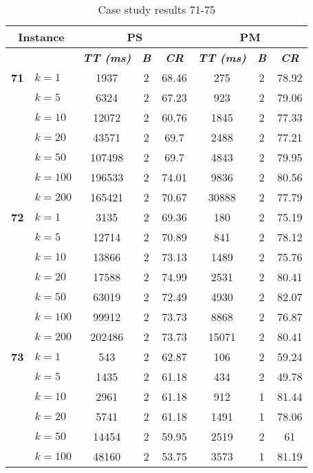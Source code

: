     \begin{table}[htbp]
    \caption{Case study results 71-75}
    \centering
    \begin{tabular}{|l|l|c|c|c|c|c|c|}
    \hline
    \multicolumn{ 2}{|c|}{\textbf{Instance}} & \multicolumn{ 3}{c|}{\textbf{PS}} & \multicolumn{ 3}{c|}{\textbf{PM}} \\ \hline
    \multicolumn{ 2}{|l|}{} & \textbf{\textit{TT (ms)}} & \textbf{\textit{B}} & \textbf{\textit{CR}} & \textbf{\textit{TT (ms)}} & \textbf{\textit{B}} & \textbf{\textit{CR}} \\ \hline
    \multicolumn{1}{|r|}{\textbf{71}} & $k=1$ & 1937 & 2 & 68.46 & 275 & 2 & 78.92 \\ 
     & $k=5$ & 6324 & 2 & 67.23 & 923 & 2 & 79.06 \\ 
     & $k=10$ & 12072 & 2 & 60.76 & 1845 & 2 & 77.33 \\ 
     & $k=20$ & 43571 & 2 & 69.7 & 2488 & 2 & 77.21 \\ 
     & $k=50$ & 107498 & 2 & 69.7 & 4843 & 2 & 79.95 \\ 
     & $k=100$ & 196533 & 2 & 74.01 & 9836 & 2 & 80.56 \\ 
     & $k=200$ & 165421 & 2 & 70.67 & 30888 & 2 & 77.79 \\ \hline
    \multicolumn{1}{|r|}{\textbf{72}} & $k=1$ & 3135 & 2 & 69.36 & 180 & 2 & 75.19 \\ 
     & $k=5$ & 12714 & 2 & 70.89 & 841 & 2 & 78.12 \\ 
     & $k=10$ & 13866 & 2 & 73.13 & 1489 & 2 & 75.76 \\ 
     & $k=20$ & 17588 & 2 & 74.99 & 2531 & 2 & 80.41 \\ 
     & $k=50$ & 63019 & 2 & 72.49 & 4930 & 2 & 82.07 \\ 
     & $k=100$ & 99912 & 2 & 73.73 & 8868 & 2 & 76.87 \\ 
     & $k=200$ & 202486 & 2 & 73.73 & 15071 & 2 & 80.41 \\ \hline
    \multicolumn{1}{|r|}{\textbf{73}} & $k=1$ & 543 & 2 & 62.87 & 106 & 2 & 59.24 \\ 
     & $k=5$ & 1435 & 2 & 61.18 & 434 & 2 & 49.78 \\ 
     & $k=10$ & 2961 & 2 & 61.18 & 912 & 1 & 81.44 \\ 
     & $k=20$ & 5741 & 2 & 61.18 & 1491 & 1 & 78.06 \\ 
     & $k=50$ & 14454 & 2 & 59.95 & 2519 & 2 & 61 \\ 
     & $k=100$ & 48160 & 2 & 53.75 & 3573 & 1 & 81.19 \\ 

\end{tabular}
\end{table}
